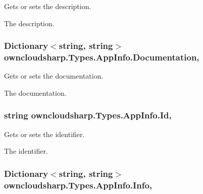 Gets or sets the description. 

The description.\hypertarget{classowncloudsharp_1_1_types_1_1_app_info_ae9ef7fbc3cdcf9f49cd7372d13249225}{}
\subsubsection[{Documentation}]{\setlength{\rightskip}{0pt plus 5cm}Dictionary$<$string, string$>$ owncloudsharp.\+Types.\+App\+Info.\+Documentation\hspace{0.3cm}{\ttfamily [get]}, {\ttfamily [set]}}\label{classowncloudsharp_1_1_types_1_1_app_info_ae9ef7fbc3cdcf9f49cd7372d13249225}


Gets or sets the documentation. 

The documentation.\hypertarget{classowncloudsharp_1_1_types_1_1_app_info_ac12addd408514cce9faac8898bb70b70}{}
\subsubsection[{Id}]{\setlength{\rightskip}{0pt plus 5cm}string owncloudsharp.\+Types.\+App\+Info.\+Id\hspace{0.3cm}{\ttfamily [get]}, {\ttfamily [set]}}\label{classowncloudsharp_1_1_types_1_1_app_info_ac12addd408514cce9faac8898bb70b70}


Gets or sets the identifier. 

The identifier.\hypertarget{classowncloudsharp_1_1_types_1_1_app_info_ad3b2d2f748b0752b632d9034b19e4503}{}
\subsubsection[{Info}]{\setlength{\rightskip}{0pt plus 5cm}Dictionary$<$string, string$>$ owncloudsharp.\+Types.\+App\+Info.\+Info\hspace{0.3cm}{\ttfamily [get]}, {\ttfamily [set]}}\label{classowncloudsharp_1_1_types_1_1_app_info_ad3b2d2f748b0752b632d9034b19e4503}


